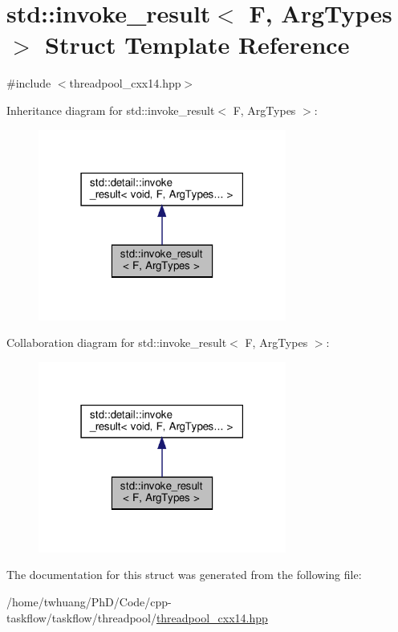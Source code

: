 \hypertarget{structstd_1_1invoke__result}{}\section{std\+:\+:invoke\+\_\+result$<$ F, Arg\+Types $>$ Struct Template Reference}
\label{structstd_1_1invoke__result}


{\ttfamily \#include $<$threadpool\+\_\+cxx14.\+hpp$>$}



Inheritance diagram for std\+:\+:invoke\+\_\+result$<$ F, Arg\+Types $>$\+:\nopagebreak
\begin{figure}[H]
\begin{center}
\leavevmode
\includegraphics[width=231pt]{structstd_1_1invoke__result__inherit__graph}
\end{center}
\end{figure}


Collaboration diagram for std\+:\+:invoke\+\_\+result$<$ F, Arg\+Types $>$\+:\nopagebreak
\begin{figure}[H]
\begin{center}
\leavevmode
\includegraphics[width=231pt]{structstd_1_1invoke__result__coll__graph}
\end{center}
\end{figure}


The documentation for this struct was generated from the following file\+:\begin{DoxyCompactItemize}
\item 
/home/twhuang/\+Ph\+D/\+Code/cpp-\/taskflow/taskflow/threadpool/\hyperlink{threadpool__cxx14_8hpp}{threadpool\+\_\+cxx14.\+hpp}\end{DoxyCompactItemize}
